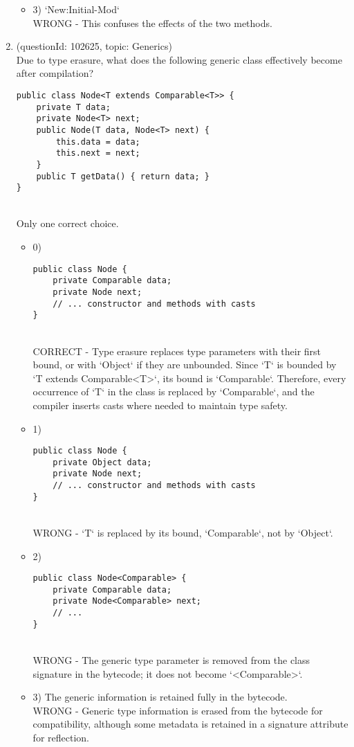 \documentclass[12pt]{article}
\begin{document}
\begin{enumerate}[label=(\arabic*)]
\begin{itemize}
\item 3) `New:Initial-Mod`
 \\ 
WRONG - This confuses the effects of the two methods.

\end{itemize}
\item (questionId: 102625, topic: Generics) \\ 
Due to type erasure, what does the following generic class effectively become after compilation?\begin{verbatim}
public class Node<T extends Comparable<T>> {
    private T data;
    private Node<T> next;
    public Node(T data, Node<T> next) {
        this.data = data;
        this.next = next;
    }
    public T getData() { return data; }
}
\end{verbatim}
\\ \noindent Only one correct choice. 
\begin{itemize}
\item 0) \begin{verbatim}public class Node {
    private Comparable data;
    private Node next;
    // ... constructor and methods with casts
}\end{verbatim}
 \\ 
CORRECT - Type erasure replaces type parameters with their first bound, or with `Object` if they are unbounded. Since `T` is bounded by `T extends Comparable<T>`, its bound is `Comparable`. Therefore, every occurrence of `T` in the class is replaced by `Comparable`, and the compiler inserts casts where needed to maintain type safety.

\item 1) \begin{verbatim}public class Node {
    private Object data;
    private Node next;
    // ... constructor and methods with casts
}\end{verbatim}
 \\ 
WRONG - `T` is replaced by its bound, `Comparable`, not by `Object`.

\item 2) \begin{verbatim}public class Node<Comparable> {
    private Comparable data;
    private Node<Comparable> next;
    // ...
}\end{verbatim}
 \\ 
WRONG - The generic type parameter is removed from the class signature in the bytecode; it does not become `<Comparable>`.

\item 3) The generic information is retained fully in the bytecode.
 \\ 
WRONG - Generic type information is erased from the bytecode for compatibility, although some metadata is retained in a signature attribute for reflection.


\end{itemize}
\end{enumerate}
\end{document}
